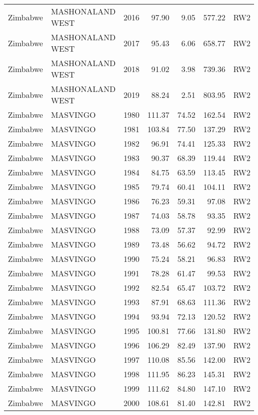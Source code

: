 \begin{longtable}{lllrrrl}
  Zimbabwe & MASHONALAND WEST & 2016 & 97.90 & 9.05 & 577.22 & RW2 \\ 
  Zimbabwe & MASHONALAND WEST & 2017 & 95.43 & 6.06 & 658.77 & RW2 \\ 
  Zimbabwe & MASHONALAND WEST & 2018 & 91.02 & 3.98 & 739.36 & RW2 \\ 
  Zimbabwe & MASHONALAND WEST & 2019 & 88.24 & 2.51 & 803.95 & RW2 \\ 
  Zimbabwe & MASVINGO & 1980 & 111.37 & 74.52 & 162.54 & RW2 \\ 
  Zimbabwe & MASVINGO & 1981 & 103.84 & 77.50 & 137.29 & RW2 \\ 
  Zimbabwe & MASVINGO & 1982 & 96.91 & 74.41 & 125.33 & RW2 \\ 
  Zimbabwe & MASVINGO & 1983 & 90.37 & 68.39 & 119.44 & RW2 \\ 
  Zimbabwe & MASVINGO & 1984 & 84.75 & 63.59 & 113.45 & RW2 \\ 
  Zimbabwe & MASVINGO & 1985 & 79.74 & 60.41 & 104.11 & RW2 \\ 
  Zimbabwe & MASVINGO & 1986 & 76.23 & 59.31 & 97.08 & RW2 \\ 
  Zimbabwe & MASVINGO & 1987 & 74.03 & 58.78 & 93.35 & RW2 \\ 
  Zimbabwe & MASVINGO & 1988 & 73.09 & 57.37 & 92.99 & RW2 \\ 
  Zimbabwe & MASVINGO & 1989 & 73.48 & 56.62 & 94.72 & RW2 \\ 
  Zimbabwe & MASVINGO & 1990 & 75.24 & 58.21 & 96.83 & RW2 \\ 
  Zimbabwe & MASVINGO & 1991 & 78.28 & 61.47 & 99.53 & RW2 \\ 
  Zimbabwe & MASVINGO & 1992 & 82.54 & 65.47 & 103.72 & RW2 \\ 
  Zimbabwe & MASVINGO & 1993 & 87.91 & 68.63 & 111.36 & RW2 \\ 
  Zimbabwe & MASVINGO & 1994 & 93.94 & 72.13 & 120.52 & RW2 \\ 
  Zimbabwe & MASVINGO & 1995 & 100.81 & 77.66 & 131.80 & RW2 \\ 
  Zimbabwe & MASVINGO & 1996 & 106.29 & 82.49 & 137.90 & RW2 \\ 
  Zimbabwe & MASVINGO & 1997 & 110.08 & 85.56 & 142.00 & RW2 \\ 
  Zimbabwe & MASVINGO & 1998 & 111.95 & 86.23 & 145.31 & RW2 \\ 
  Zimbabwe & MASVINGO & 1999 & 111.62 & 84.80 & 147.10 & RW2 \\ 
  Zimbabwe & MASVINGO & 2000 & 108.61 & 81.40 & 142.81 & RW2 \\ 

\end{longtable}
